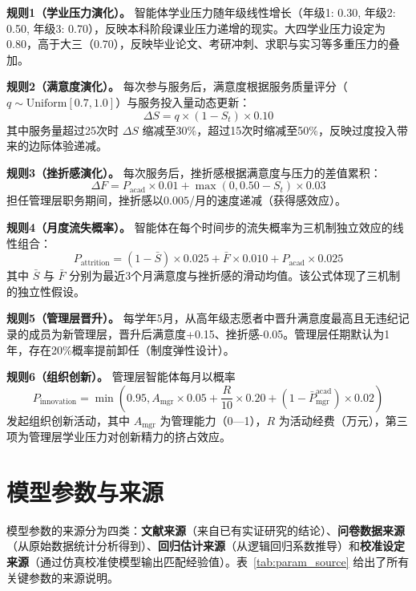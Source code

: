 \documentclass[12pt,a4paper]{article}
\begin{document}
\textbf{规则1（学业压力演化）。} 智能体学业压力随年级线性增长（年级1: 0.30, 年级2: 0.50, 年级3: 0.70），反映本科阶段课业压力递增的现实。大四学业压力设定为 0.80，高于大三（0.70），反映毕业论文、考研冲刺、求职与实习等多重压力的叠加。

\textbf{规则2（满意度演化）。} 每次参与服务后，满意度根据服务质量评分（$q \sim \text{Uniform}[0.7, 1.0]$）与服务投入量动态更新：
\begin{equation}
\Delta S = q \times (1 - S_t) \times 0.10
\end{equation}
其中服务量超过25次时 $\Delta S$ 缩减至30\%，超过15次时缩减至50\%，反映过度投入带来的边际体验递减。

\textbf{规则3（挫折感演化）。} 每次服务后，挫折感根据满意度与压力的差值累积：
\begin{equation}
\Delta F = P_{\text{acad}} \times 0.01 + \max(0, 0.50 - S_t) \times 0.03
\end{equation}
担任管理层职务期间，挫折感以$0.005$/月的速度递减（获得感效应）。

\textbf{规则4（月度流失概率）。} 智能体在每个时间步的流失概率为三机制独立效应的线性组合：
\begin{equation}
P_{\text{attrition}} = (1 - \bar{S}) \times 0.025 + \bar{F} \times 0.010 + P_{\text{acad}} \times 0.025
\end{equation}
其中 $\bar{S}$ 与 $\bar{F}$ 分别为最近3个月满意度与挫折感的滑动均值。该公式体现了三机制的独立性假设。

\textbf{规则5（管理层晋升）。} 每学年5月，从高年级志愿者中晋升满意度最高且无违纪记录的成员为新管理层，晋升后满意度+0.15、挫折感-0.05。管理层任期默认为1年，存在20\%概率提前卸任（制度弹性设计）。

\textbf{规则6（组织创新）。} 管理层智能体每月以概率
\begin{equation}
P_{\text{innovation}} = \min\left(0.95, A_{\text{mgr}} \times 0.05 + \frac{R}{10} \times 0.20 + (1 - \bar{P}^{\text{acad}}_{\text{mgr}}) \times 0.02\right)
\end{equation}
发起组织创新活动，其中 $A_{\text{mgr}}$ 为管理能力（0—1），$R$ 为活动经费（万元），第三项为管理层学业压力对创新精力的挤占效应。

\section{模型参数与来源}

模型参数的来源分为四类：\textbf{文献来源}（来自已有实证研究的结论）、\textbf{问卷数据来源}（从原始数据统计分析得到）、\textbf{回归估计来源}（从逻辑回归系数推导）和\textbf{校准设定来源}（通过仿真校准使模型输出匹配经验值）。表~\ref{tab:param_source} 给出了所有关键参数的来源说明。
\end{document}
